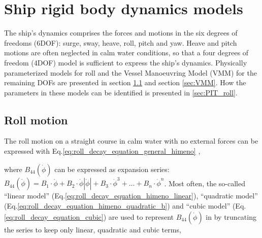 \chapter{Ship rigid body dynamics models}
\label{ch:models}

The ship's dynamics comprises the forces and motions in the six degrees of freedoms (6DOF): surge, sway, heave, roll, pitch and yaw. Heave and pitch motions are often neglected in calm water conditions, so that a four degrees of freedom (4DOF) model is sufficient to express the ship's dynamics. Physically parameterized models for roll and the Vessel Manoeuvring Model (VMM) for the remaining DOFs are presented in section \ref{sec:roll} and section \ref{sec:VMM}. How the parameters in these models can be identified is presented in \ref{sec:PIT_roll}.

\section{Roll motion} \label{sec:roll}

The roll motion on a straight course in calm water with no external forces can be expressed with Eq.\ref{eq:roll_decay_equation_general_himeno} \cite{himeno_prediction_1981},


\noindent where $B_{44}\left(\dot{\phi}\right)$ can be expressed as expansion series:  
$ B_{44}\left(\dot{\phi}\right) = B_1\cdot\dot{\phi} + B_2\cdot\dot{\phi}\left|\dot{\phi}\right| + B_3\cdot\dot{\phi}^3 + ... + B_n\cdot\dot{\phi}^n$. Most often, the so-called ``linear model'' (Eq.\ref{eq:roll_decay_equation_himeno_linear}), ``quadratic model'' (Eq.\ref{eq:roll_decay_equation_himeno_quadratic_b}) and ``cubic model'' (Eq.\ref{eq:roll_decay_equation_cubic}) are used to represent $B_{44}(\dot{\phi})$ in by truncating the series to keep only linear, quadratic and cubic terms,






